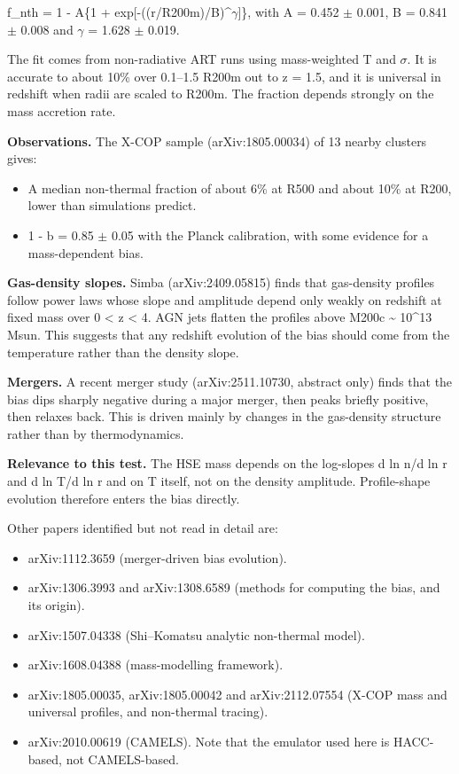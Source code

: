 \documentclass[11pt,a4paper]{article}
\begin{document}
f\_nth = 1 - A\{1 + exp[-((r/R200m)/B)\textasciicircum{}$\gamma$]\}, with A = 0.452 $\pm$ 0.001, B = 0.841 $\pm$ 0.008 and $\gamma$ = 1.628 $\pm$ 0.019.

The fit comes from non-radiative ART runs using mass-weighted T and $\sigma$. It is accurate to about 10\% over 0.1--1.5 R200m out to z = 1.5, and it is universal in redshift when radii are scaled to R200m. The fraction depends strongly on the mass accretion rate.

\textbf{Observations.} The X-COP sample (arXiv:1805.00034) of 13 nearby clusters gives:

\begin{itemize}
  \item A median non-thermal fraction of about 6\% at R500 and about 10\% at R200, lower than simulations predict.
  \item 1 - b = 0.85 $\pm$ 0.05 with the Planck calibration, with some evidence for a mass-dependent bias.
\end{itemize}
\textbf{Gas-density slopes.} Simba (arXiv:2409.05815) finds that gas-density profiles follow power laws whose slope and amplitude depend only weakly on redshift at fixed mass over 0 \textless{} z \textless{} 4. AGN jets flatten the profiles above M200c \textasciitilde{} 10\textasciicircum{}13 Msun. This suggests that any redshift evolution of the bias should come from the temperature rather than the density slope.

\textbf{Mergers.} A recent merger study (arXiv:2511.10730, abstract only) finds that the bias dips sharply negative during a major merger, then peaks briefly positive, then relaxes back. This is driven mainly by changes in the gas-density structure rather than by thermodynamics.

\textbf{Relevance to this test.} The HSE mass depends on the log-slopes d ln n/d ln r and d ln T/d ln r and on T itself, not on the density amplitude. Profile-shape evolution therefore enters the bias directly.

Other papers identified but not read in detail are:

\begin{itemize}
  \item arXiv:1112.3659 (merger-driven bias evolution).
  \item arXiv:1306.3993 and arXiv:1308.6589 (methods for computing the bias, and its origin).
  \item arXiv:1507.04338 (Shi--Komatsu analytic non-thermal model).
  \item arXiv:1608.04388 (mass-modelling framework).
  \item arXiv:1805.00035, arXiv:1805.00042 and arXiv:2112.07554 (X-COP mass and universal profiles, and non-thermal tracing).
  \item arXiv:2010.00619 (CAMELS). Note that the emulator used here is HACC-based, not CAMELS-based.
\end{itemize}
\end{document}
